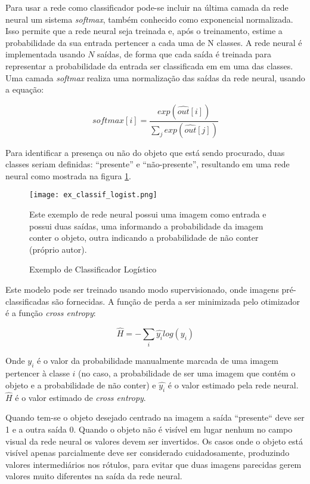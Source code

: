 Para usar a rede como classificador pode-se incluir na última camada da rede
neural um sistema \emph{softmax}, também conhecido como exponencial
normalizada. Isso
permite que a rede neural seja treinada e, após o treinamento, estime a
probabilidade da sua entrada pertencer a cada uma de N classes. A rede neural é
implementada usando $N$ saídas, de forma que cada saída é treinada para
representar a probabilidade da entrada ser classificada em em uma das classes.
Uma camada \emph{softmax} realiza uma normalização das saídas da rede neural,
usando a equação:

\begin{equation}
	softmax[i] = \frac
		{exp\left( \widehat{out}[i] \right)}
		{\sum_j exp\left( \widehat{out}[j] \right)}
\end{equation}

Para identificar a presença ou não do objeto que está sendo procurado, duas
classes seriam definidas: ``presente'' e ``não-presente'', resultando em uma rede
neural como mostrada na figura \ref{fig:ex_classif_logist}.

\begin{figure}[!htb]
	\centering
	\texttt{[image: ex\_classif\_logist.png]}
	\caption{Exemplo de Classificador Logístico}
	\label{fig:ex_classif_logist}
	Este exemplo de rede neural possui uma imagem como entrada e possui duas
	saídas, uma informando a probabilidade da imagem conter o objeto, outra
	indicando a probabilidade de não conter (próprio autor).
\end{figure}

Este modelo pode ser treinado usando modo supervisionado, onde imagens
pré-classificadas são fornecidas. A função de perda a ser minimizada pelo
otimizador é a função \emph{cross entropy}:

\begin{equation}
	\widehat{H} = - \sum_i \widehat{y_i} log(y_i)
\end{equation}

Onde $y_i$ é o valor da probabilidade manualmente
marcada de uma imagem pertencer à classe $i$ (no caso, a probabilidade de ser
uma imagem que contém o objeto e a probabilidade de não conter) e $\widehat{y_i}$
é o valor estimado pela rede neural. $\widehat{H}$ é o valor estimado de
\emph{cross entropy}.

Quando tem-se o objeto desejado centrado na imagem a saída ``presente`` deve
ser 1 e a outra saída 0. Quando o objeto não é visível em lugar nenhum no campo
visual da rede neural os valores devem ser invertidos.
Os casos onde o objeto está visível apenas parcialmente deve ser considerado
cuidadosamente, produzindo valores intermediários nos rótulos, para evitar que
duas imagens parecidas gerem valores muito diferentes na saída da rede neural.

